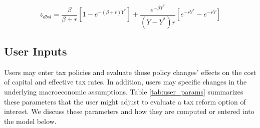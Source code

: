 \documentclass[article,11pt,letterpaper,fleqn]{article}
\theoremstyle{definition}
\numberwithin{equation}{section}
\begin{document}
\begin{equation}
z_{dbsl}=\frac{\beta}{\beta+r}\left[1-e^{-(\beta+r)Y^{*}}\right]+\frac{e^{-\beta Y^{*}}}{(Y-Y^{*})r}\left[e^{-rY^{*}}-e^{-rY}\right]
\end{equation}

%
%
%
%
%
%
%



\subsection{User Inputs}

Users may enter tax policies and evaluate those policy changes' effects on the cost of capital and effective tax rates.  In addition, users may specific changes in the underlying macroeconomic assumptions.  Table \ref{tab:user_params} summarizes these parameters that the user might adjust to evaluate a tax reform option of interest.  We discuss these parameters and how they are computed or entered into the model below.
\end{document}
